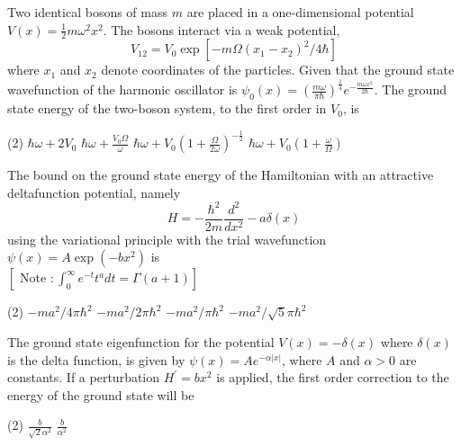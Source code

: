 \begin{enumerate}
\begin{minipage}{\textwidth}
	\item Two identical bosons of mass $m$ are placed in a one-dimensional potential $V(x)=\frac{1}{2} m \omega^{2} x^{2} .$ The bosons interact via a weak potential,
	$$
	V_{12}=V_{0} \exp \left[-m \Omega\left(x_{1}-x_{2}\right)^{2} / 4 \hbar\right]
	$$
	where $x_{1}$ and $x_{2}$ denote coordinates of the particles. Given that the ground state wavefunction of the harmonic oscillator is $\psi_{0}(x)=\left(\frac{m \omega}{\pi \hbar}\right)^{\frac{1}{4}} e^{-\frac{m \omega x^{2}}{2 \hbar}} .$ The ground state energy of the two-boson system, to the first order in $V_{0}$, is
\end{minipage}
\begin{tasks}(2)
	\task[\textbf{A.}] $\hbar \omega+2 V_{0}$
	\task[\textbf{B.}]$\hbar \omega+\frac{V_{0} \Omega}{\omega}$
	\task[\textbf{C.}]$\hbar \omega+V_{0}\left(1+\frac{\Omega}{2 \omega}\right)^{-\frac{1}{2}}$
	\task[\textbf{D.}]$\hbar \omega+V_{0}\left(1+\frac{\omega}{\Omega}\right)$
\end{tasks}
\begin{minipage}{\textwidth}
	\item The bound on the ground state energy of the Hamiltonian with an attractive deltafunction potential, namely
	$$
	H=-\frac{\hbar^{2}}{2 m} \frac{d^{2}}{d x^{2}}-a \delta(x)
	$$
	using the variational principle with the trial wavefunction $\psi(x)=A \exp \left(-b x^{2}\right)$ is\\
	$\left[\text { Note }: \int_{0}^{\infty} e^{-t} t^{a} d t=\Gamma(a+1)\right]$
\end{minipage}
\begin{tasks}(2)
	\task[\textbf{A.}] $-m a^{2} / 4 \pi \hbar^{2}$
	\task[\textbf{B.}]$-m a^{2} / 2 \pi \hbar^{2}$
	\task[\textbf{C.}]$-m a^{2} / \pi \hbar^{2}$
	\task[\textbf{D.}]$-m a^{2} / \sqrt{5} \pi \hbar^{2}$
\end{tasks}
\begin{minipage}{\textwidth}
	\item The ground state eigenfunction for the potential $V(x)=-\delta(x)$ where $\delta(x)$ is the delta function, is given by $\psi(x)=A e^{-\alpha|x|}$, where $A$ and $\alpha>0$ are constants. If a perturbation $H^{\prime}=b x^{2}$ is applied, the first order correction to the energy of the ground state will be
\end{minipage}
\begin{tasks}(2)
	\task[\textbf{A.}] $\frac{b}{\sqrt{2} \alpha^{2}}$ 
	\task[\textbf{B.}]$\frac{b}{\alpha^{2}}$

\end{tasks}
\end{enumerate}
